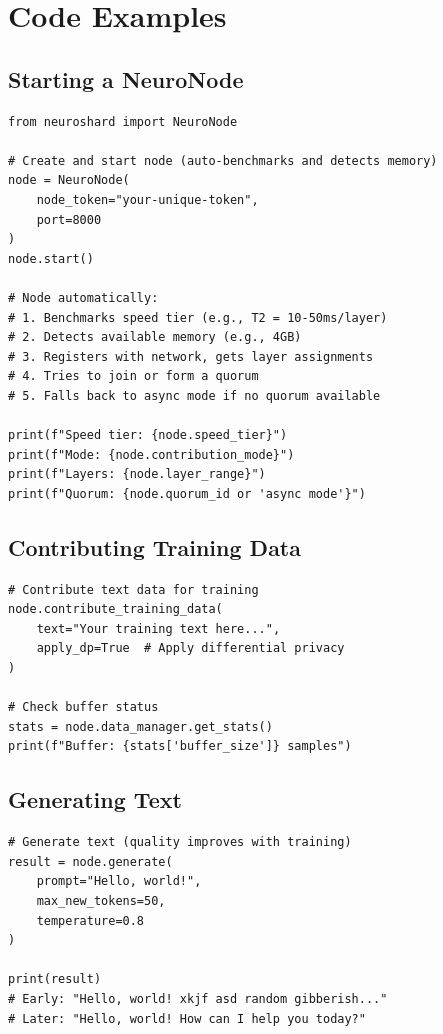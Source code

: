 \documentclass[11pt,a4paper]{article}
\begin{document}
\appendix

\section{Code Examples}

\subsection{Starting a NeuroNode}

\begin{lstlisting}[caption=Node Startup]
from neuroshard import NeuroNode

# Create and start node (auto-benchmarks and detects memory)
node = NeuroNode(
    node_token="your-unique-token",
    port=8000
)
node.start()

# Node automatically:
# 1. Benchmarks speed tier (e.g., T2 = 10-50ms/layer)
# 2. Detects available memory (e.g., 4GB)
# 3. Registers with network, gets layer assignments
# 4. Tries to join or form a quorum
# 5. Falls back to async mode if no quorum available

print(f"Speed tier: {node.speed_tier}")
print(f"Mode: {node.contribution_mode}")
print(f"Layers: {node.layer_range}")
print(f"Quorum: {node.quorum_id or 'async mode'}")
\end{lstlisting}

\subsection{Contributing Training Data}

\begin{lstlisting}[caption=Data Contribution]
# Contribute text data for training
node.contribute_training_data(
    text="Your training text here...",
    apply_dp=True  # Apply differential privacy
)

# Check buffer status
stats = node.data_manager.get_stats()
print(f"Buffer: {stats['buffer_size']} samples")
\end{lstlisting}

\subsection{Generating Text}

\begin{lstlisting}[caption=Text Generation]
# Generate text (quality improves with training)
result = node.generate(
    prompt="Hello, world!",
    max_new_tokens=50,
    temperature=0.8
)

print(result)
# Early: "Hello, world! xkjf asd random gibberish..."
# Later: "Hello, world! How can I help you today?"
\end{lstlisting}
\end{document}
